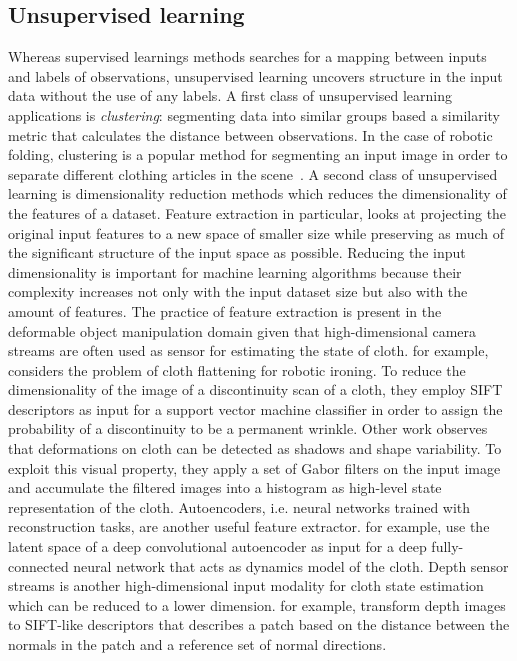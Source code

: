 \documentclass[\home/main.tex]{subfiles}
\begin{document}
\subsection{Unsupervised learning}
Whereas supervised learnings methods searches for a mapping between inputs and labels of observations, unsupervised learning uncovers structure in the input data without the use of any labels. A first class of unsupervised learning applications is \emph{clustering}: segmenting data into similar groups based a similarity metric that calculates the distance between observations. In the case of robotic folding, clustering is a popular method for segmenting an input image in order to separate different clothing articles in the scene~\autocite{Doumanoglou2016,Maitin2010,Jia2018}. A second class of unsupervised learning is dimensionality reduction methods which reduces the dimensionality of the features of a dataset. Feature extraction in particular, looks at projecting the original input features to a new space of smaller size while preserving as much of the significant structure of the input space as possible. Reducing the input dimensionality is important for machine learning algorithms because their complexity increases not only with the input dataset size but also with the amount of features. 
The practice of feature extraction is present in the deformable object manipulation domain given that high-dimensional camera streams are often used as sensor for estimating the state of cloth. \textcite{li2016multi} for example, considers the problem of cloth flattening for robotic ironing. To reduce the dimensionality of the image of a discontinuity scan of a cloth, they employ SIFT descriptors \autocite{lowe1999object} as input for a support vector machine classifier in order to assign the probability of a discontinuity to be a permanent wrinkle. Other work\autocite{Jia2018} observes that deformations on cloth can be detected as shadows and shape variability. To exploit this visual property, they apply a set of Gabor filters on the input image and accumulate the filtered images into a histogram as high-level state representation of the cloth. Autoencoders, i.e. neural networks trained with reconstruction tasks, are another useful feature extractor. \textcite{Yang2017} for example, use the latent space of a deep convolutional autoencoder as input for a deep fully-connected neural network that acts as dynamics model of the cloth. Depth sensor streams is another high-dimensional input modality for cloth state estimation which can be reduced to a lower dimension. \textcite{Ramisa2013} for example, transform depth images to SIFT-like descriptors that describes a patch based on the distance between the normals in the patch and a reference set of normal directions.
\end{document}
